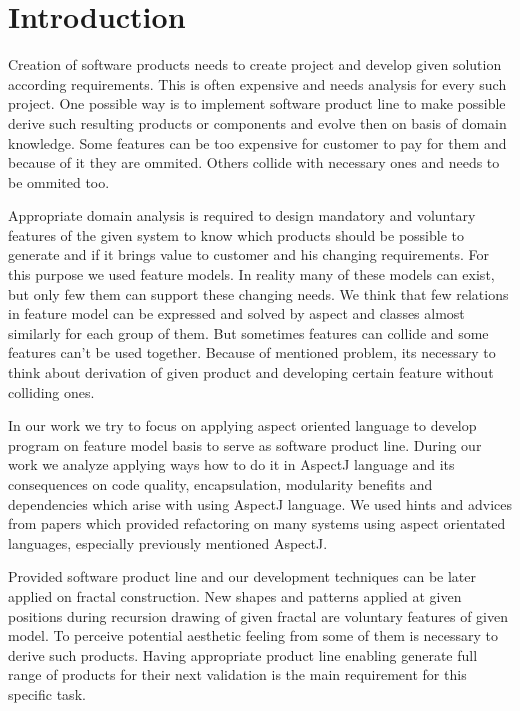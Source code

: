 \documentclass[11pt,slovak,a4paper,twoside]{article}
\begin{document}
\section{Introduction} \label{introduction}
Creation of software products needs to create project and develop given solution according requirements. This is often expensive and needs analysis for every such project. One possible way is to implement software product line to make possible derive such resulting products or components and evolve then on basis of domain knowledge. Some features can be too expensive for customer to pay for them and because of it they are ommited. Others collide with necessary ones and needs to be ommited too. 

Appropriate domain analysis is required to design mandatory and voluntary features of the given system to know which products should be possible to generate and if it brings value to customer and his changing requirements. For this purpose we used feature models. In reality many of these models can exist, but only few them can support these changing needs. We think that few relations in feature model can be expressed and solved by aspect and classes almost similarly for each group of them. But sometimes features can collide and some features can't be used together. Because of mentioned problem, its necessary to think about derivation of given product and developing certain feature without colliding ones.  

In our work we try to focus on applying aspect oriented language to develop program on feature model basis to serve as software product line. During our work we analyze applying ways how to do it in AspectJ language and its consequences on code quality, encapsulation, modularity benefits and dependencies which arise with using AspectJ language. We used hints and advices from papers which provided refactoring on many systems using aspect orientated languages, especially previously mentioned AspectJ.

Provided software product line and our development techniques can be later applied on fractal construction. New shapes and patterns applied at given positions during recursion drawing of given fractal are voluntary features of given model. To perceive potential aesthetic feeling from some of them is necessary to derive such products. Having appropriate product line enabling generate full range of products for their next validation is the main requirement for this specific task.

  
\end{document}
